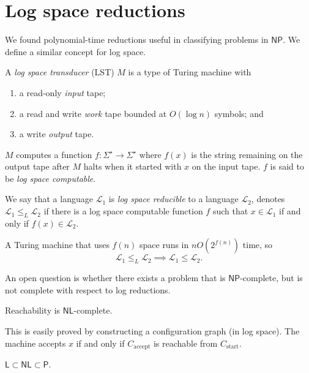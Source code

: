 \section{Log space reductions}

We found polynomial-time reductions useful in classifying problems in
$\mathsf{NP}$.
We define a similar concept for log space.

\begin{definition}
	A \emph{log space transducer} (LST) $M$ is a type of Turing machine
	with
	\begin{enumerate}
		\item a read-only \emph{input} tape;
		\item a read and write \emph{work} tape bounded at $O(\log n)$
			symbols; and
		\item a write \emph{output} tape.
	\end{enumerate}
	$M$ computes a function $f: \Sigma^\star \to \Sigma^\star$
	where $f(x)$ is the string remaining on the output tape after $M$ halts when
	it started with $x$ on the input tape.
	$f$ is said to be \emph{log space computable}.
\end{definition}

\begin{definition}
	We say that a language $\mathcal L_1$ is
	\emph{log space reducible} to a language $\mathcal L_2$,
	denotes $\mathcal L_1 \leq_L \mathcal L_2$ if there is a log space
	computable function $f$ such that $x \in \mathcal L_1$ if and only if
	$f(x) \in \mathcal L_2$.
\end{definition}

A Turing machine that uses $f(n)$ space
runs in $nO\left( 
	2^{f(n)} 
\right)$ time, so
\[
	\mathcal L_1 \leq_L \mathcal L_2 \implies
	\mathcal L_1 \leq \mathcal L_2.
\]

An open question is whether there exists a problem that is 
$\mathsf{NP}$-complete, but is not complete with respect to log reductions.

\begin{theorem}[]
	Reachability is $\mathsf{NL}$-complete.
\end{theorem}

This is easily proved by constructing a configuration graph (in log space).
The machine accepts $x$ if and only if $C_\text{accept}$ is reachable from
$C_\text{start}$.

\begin{corollary}[]
	$\mathsf L \subset \mathsf{NL} \subset \mathsf P$.
\end{corollary}

